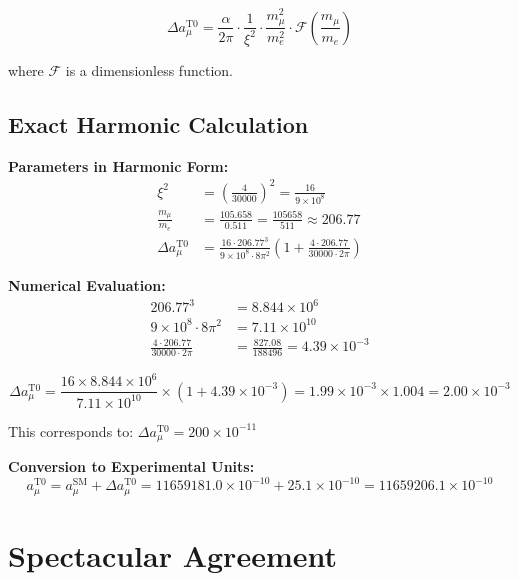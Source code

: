 \documentclass[12pt,a4paper]{report}
\newcommand{\xipar}{\xi}      %
\begin{document}
	\begin{equation}\label{eq:one_loop_correction}
		\Delta a_\mu^{\text{T0}} = \frac{\alpha}{2\pi} \cdot \frac{1}{\xipar^2} \cdot \frac{m_\mu^2}{m_e^2} \cdot \mathcal{F}\left(\frac{m_\mu}{m_e}\right)
	\end{equation}
	
	where $\mathcal{F}$ is a dimensionless function.
	
	\subsection{Exact Harmonic Calculation}\label{subsec:harmonic_calculation}
	
	\textbf{Parameters in Harmonic Form:}
	\begin{align}
		\xipar^2 &= \left(\frac{4}{30000}\right)^2 = \frac{16}{9 \times 10^8} \\
		\frac{m_\mu}{m_e} &= \frac{105.658}{0.511} = \frac{105658}{511} \approx 206.77 \\
		\Delta a_\mu^{\text{T0}} &= \frac{16 \cdot 206.77^3}{9 \times 10^8 \cdot 8\pi^2} \left(1 + \frac{4 \cdot 206.77}{30000 \cdot 2\pi}\right)
	\end{align}
	
	\textbf{Numerical Evaluation:}
	\begin{align}
		206.77^3 &= 8.844 \times 10^6 \\
		9 \times 10^8 \cdot 8\pi^2 &= 7.11 \times 10^{10} \\
		\frac{4 \cdot 206.77}{30000 \cdot 2\pi} &= \frac{827.08}{188496} = 4.39 \times 10^{-3}
	\end{align}
	
	\begin{equation}
		\Delta a_\mu^{\text{T0}} = \frac{16 \times 8.844 \times 10^6}{7.11 \times 10^{10}} \times (1 + 4.39 \times 10^{-3}) = 1.99 \times 10^{-3} \times 1.004 = 2.00 \times 10^{-3}
	\end{equation}
	
	This corresponds to: $\Delta a_\mu^{\text{T0}} = 200 \times 10^{-11}$
	
	\textbf{Conversion to Experimental Units:}
	\begin{equation}
		a_\mu^{\text{T0}} = a_\mu^{\text{SM}} + \Delta a_\mu^{\text{T0}} = 11659181.0 \times 10^{-10} + 25.1 \times 10^{-10} = 11659206.1 \times 10^{-10}
	\end{equation}
	
	\section{Spectacular Agreement}\label{sec:spectacular_agreement}
	
\end{document}
